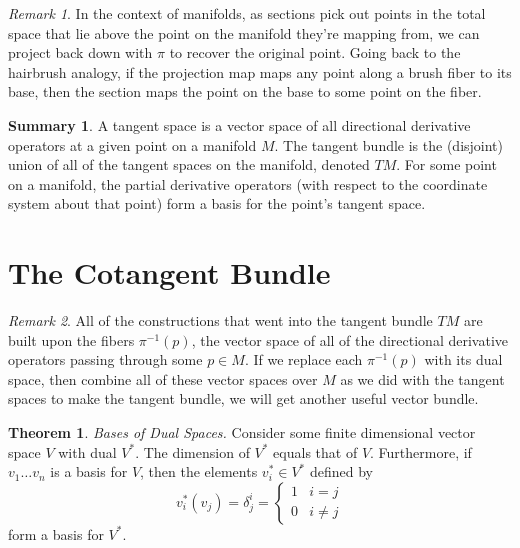 \documentclass[10pt,landscape]{article}
\theoremstyle{definition}
\theoremstyle{theorem}
\newtheorem{theorem}{Theorem}[section]
\theoremstyle{summary}
\newtheorem*{summary}{Summary}
\theoremstyle{remark}
\newtheorem*{remark}{Remark}
\newcommand{\R}{\mathbb{R}}
\begin{document}
\begin{multicols*}{3}
\begin{remark}
    In the context of manifolds, as sections pick out points in the total space that lie above the point on the manifold they're mapping from, we can project back down with $\pi$ to recover the original point. Going back to the hairbrush analogy, if the projection map maps any point along a brush fiber to its base, then the section maps the point on the base to some point on the fiber.
\end{remark}

\begin{summary}
    A tangent space is a vector space of all directional derivative operators at a given point on a manifold $M$. The tangent bundle is the (disjoint) union of all of the tangent spaces on the manifold, denoted $TM$. For some point on a manifold, the partial derivative operators (with respect to the coordinate system about that point) form a basis for the point's tangent space.
\end{summary}

\section{The Cotangent Bundle}

\begin{remark}
    All of the constructions that went into the tangent bundle $TM$ are built upon the fibers $\pi^{-1}(p)$, the vector space of all of the directional derivative operators passing through some $p\in M$. If we replace each $\pi^{-1}(p)$ with its dual space, then combine all of these vector spaces over $M$ as we did with the tangent spaces to make the tangent bundle, we will get another useful vector bundle.
\end{remark}

\theoremstyle{theorem}
\begin{theorem}{\textit{Bases of Dual Spaces.}}
\label{thm_dualbases}
    Consider some finite dimensional vector space $V$ with dual $V^*$. The dimension of $V^*$ equals that of $V$. Furthermore, if $v_1\ldots v_n$ is a basis for $V$, then the elements $v_i^*\in V^*$ defined by
    \begin{equation}
        v^*_i(v_j) = \delta_j^i = 
            \begin{cases}
                1 & i = j\\
                0 & i \neq j
            \end{cases}
    \end{equation}
    form a basis for $V^*$.
\end{theorem}


\end{multicols*}
\end{document}

